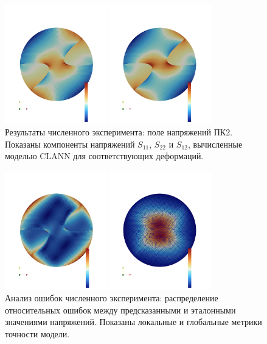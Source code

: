 \begin{figure}[htbp]
\centering
\includegraphics[width=0.8\textwidth]{img/bx_inf_S.png}
\caption{Результаты численного эксперимента: поле напряжений ПК2. Показаны компоненты напряжений $S_{11}$, $S_{22}$ и $S_{12}$, вычисленные моделью CLANN для соответствующих деформаций.}
\label{fig:numerical_stresses}
\end{figure}

\begin{figure}[htbp]
\centering
\includegraphics[width=0.8\textwidth]{img/bx_inf_err.png}
\caption{Анализ ошибок численного эксперимента: распределение относительных ошибок между предсказанными и эталонными значениями напряжений. Показаны локальные и глобальные метрики точности модели.}
\label{fig:numerical_errors}
\end{figure}



